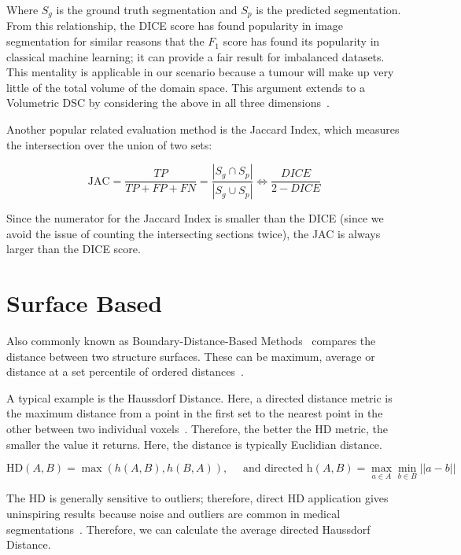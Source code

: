 \documentclass[11pt,twoside]{report}
\begin{document}
Where $S_g$ is the ground truth segmentation and $S_p$ is the predicted segmentation. From this relationship, the DICE score has found popularity in image segmentation for similar reasons that the $F_1$ score has found its popularity in classical machine learning; it can provide a fair result for imbalanced datasets. This mentality is applicable in our scenario because a tumour will make up very little of the total volume of the domain space. This argument extends to a Volumetric DSC by considering the above in all three dimensions~\cite{APL}.

Another popular related evaluation method is the Jaccard Index, which measures the intersection over the union of two sets:

\begin{equation*}
 \text{JAC} = \frac{TP}{TP+FP+FN} = \frac{|S_g\cap S_p|}{|S_g \cup S_p|} \iff \frac{DICE}{2 - DICE}
\end{equation*}

Since the numerator for the Jaccard Index is smaller than the DICE (since we avoid the issue of counting the intersecting sections twice), the JAC is always larger than the DICE score.

\section{Surface Based}\label{sect:surface-based}

Also commonly known as Boundary-Distance-Based Methods~\cite{boundary-overlap-metrics} compares the distance between two structure
surfaces. These can be maximum, average or distance at a set percentile of ordered distances~\cite{evaluation-metrics}.

A typical example is the Haussdorf Distance. Here, a directed distance metric is the maximum distance from a point in the first set to the nearest point in the other between two individual voxels~\cite{boundary-overlap-metrics}. Therefore, the better the HD metric, the smaller the value it returns. Here, the distance is typically Euclidian distance.

\begin{equation*}
 \text{HD}(A,B) = \max(h(A,B), h(B,A)), \quad \text{ and directed h}(A,B)=\max_{a\in A}\min_{b \in B} ||a-b||
\end{equation*}

The HD is generally sensitive to outliers; therefore, direct HD application gives uninspiring results because noise and outliers are common in medical segmentations~\cite{boundary-overlap-metrics}. Therefore, we can calculate the average directed Haussdorf Distance.
\end{document}
